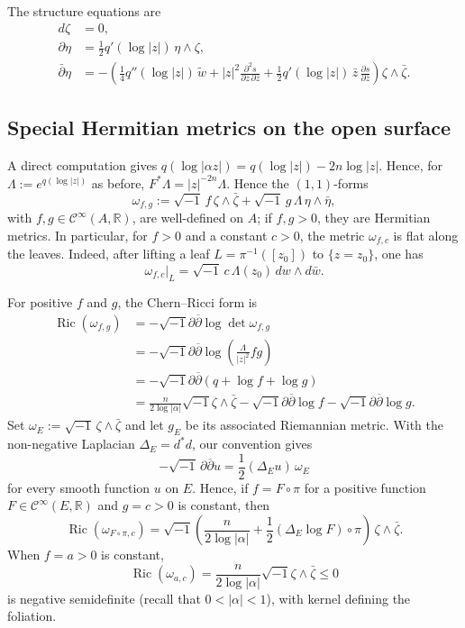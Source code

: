 \documentclass[12pt]{amsart}
\numberwithin{equation}{section}
\theoremstyle{remark}
\theoremstyle{definition}
\begin{document}
The structure equations are
\begin{align*}
d\zeta &= 0, \\
\partial\eta &= \frac{1}{2}q'(\log|z|)\,\eta\wedge\zeta, \\
\bar\partial\eta &= -\left(\frac{1}{4}q''(\log|z|)\,\tilde{w}
+|z|^{2}\frac{\partial^{2}s}{\partial z\,\partial\bar z}
+\frac{1}{2}q'(\log|z|)\,\bar z\,\frac{\partial s}{\partial\bar z}\right)\zeta\wedge\bar\zeta.
\end{align*}


\subsection{Special Hermitian metrics on the open surface}

A direct computation gives $q(\log|\alpha z|) = q(\log|z|) - 2n\log|z|$. Hence, for $\Lambda:=e^{q(\log|z|)}$ as before, $F^{*}\Lambda=|z|^{-2n}\Lambda$.
Hence the $(1,1)$-forms
\begin{equation}\label{eq:metriche-enoki}
\omega_{f,g}:=\sqrt{-1}\,f\,\zeta\wedge\bar\zeta
+\sqrt{-1}\,g\,\Lambda\,\eta\wedge\bar\eta,
\end{equation}
with $f,g\in\mathcal{C}^{\infty}(A,\mathbb{R})$, are well-defined on $A$; if $f,g>0$, they are Hermitian metrics. In particular, for $f>0$ and a constant $c>0$, the metric $\omega_{f,c}$ is flat along the leaves. Indeed, after lifting a leaf $L=\pi^{-1}([z_0])$ to $\{z=z_0\}$, one has
$$\omega_{f,c}\big|_{L}=\sqrt{-1}\,c\,\Lambda(z_0)\,dw\wedge d\bar w.$$

For positive $f$ and $g$, the Chern--Ricci form is
\begin{align*}
\operatorname{Ric}(\omega_{f,g})
&= -\sqrt{-1}\partial\overline\partial\log\det\omega_{f,g} \\
&= -\sqrt{-1}\partial\overline\partial\log\left(\frac{\Lambda}{|z|^2}fg\right) \\
&= -\sqrt{-1}\partial\overline\partial\left(q+\log f+\log g\right) \\
&= \frac{n}{2\log|\alpha|}\sqrt{-1}\zeta\wedge\bar\zeta -\sqrt{-1}\partial\overline\partial \log f -\sqrt{-1}\partial\overline\partial \log g.
\end{align*}
Set $\omega_E:=\sqrt{-1}\,\zeta\wedge\bar\zeta$ and let $g_E$ be its associated Riemannian metric. With the non-negative Laplacian $\Delta_E=d^*d$, our convention gives
$$-\sqrt{-1}\,\partial\overline\partial u=\frac12(\Delta_Eu)\,\omega_E$$
for every smooth function $u$ on $E$. Hence, if $f=F\circ\pi$ for a positive function $F\in\mathcal C^\infty(E,\mathbb R)$ and $g=c>0$ is constant, then
\begin{equation}\label{eq:ricci-1}
\operatorname{Ric}(\omega_{F\circ \pi,c}) = \sqrt{-1} \left(\frac{n}{2\log|\alpha|}+\frac{1}{2}(\Delta_E\log F) \circ \pi\right)\,\zeta\wedge\bar\zeta.
\end{equation}
When $f=a>0$ is constant,
$$ \operatorname{Ric}(\omega_{a,c})=\frac{n}{2\log|\alpha|}\sqrt{-1}\zeta\wedge\bar\zeta \leq 0 $$
is negative semidefinite (recall that $0<|\alpha|<1$), with kernel defining the foliation.
\end{document}

